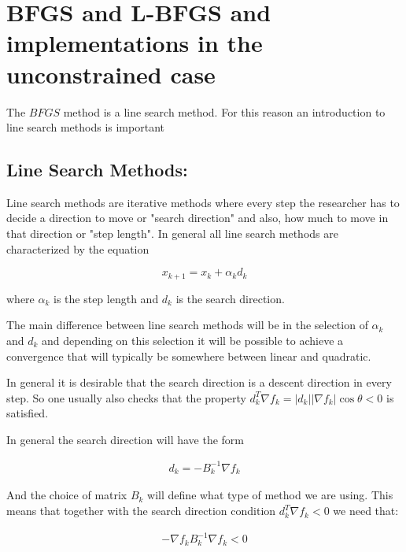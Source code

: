 \chapter{BFGS and L-BFGS and implementations in the unconstrained case}
\label{ChapterBFGS} %

The $BFGS$ method is a line search method. For this reason an introduction to line search methods is important

\section{Line Search Methods:}

Line search methods are iterative methods where every step the researcher has to decide a direction to move or "search direction" and also, how much to move in that direction or "step length". In general all line search methods are characterized by the equation

\begin{equation} \label{basiclinesearch}
  x_{k+1} = x_k + \alpha_k d_k
\end{equation}

where $\alpha_k$ is the step length and $d_k$ is the search direction.

The main difference between line search methods will be in the selection of $\alpha_k$ and $d_k$ and depending on this selection it will be possible to achieve a convergence that will typically be somewhere between linear and quadratic.

In general it is desirable that the search direction is a descent direction in every step. So one usually also checks that the property $d_k^T \nabla f_k = |d_k||\nabla f_k| \cos{\theta} < 0$ is satisfied.

In general the search direction will have the form 

\begin{equation} \label{searchdirection}
    \begin{aligned}
      d_k = -B_{k}^{-1} \nabla f_k
    \end{aligned}
\end{equation}
 
And the choice of matrix $B_k$ will define what type of method we are using. This means that together with the search direction condition $d_k^T \nabla f_k < 0$ we need that:

\begin{equation} \label{Bposdef}
  \begin{aligned}
    -\nabla f_k B_k^{-1} \nabla f_k < 0
  \end{aligned}
\end{equation}

